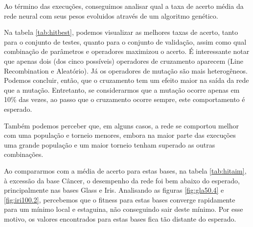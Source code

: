 \documentclass[12pt]{article}
\begin{document}
Ao término das execuções, conseguimos analisar qual a taxa de acerto média da rede neural com seus pesos evoluidos através de um algoritmo genético.

Na tabela \ref{tab:hitbest}, podemos visualizar as melhores taxas de acerto, tanto para o conjunto de testes, quanto para o conjunto de validação, assim como qual combinação de parâmetros e operadores maximizou o acerto. É interessante notar que apenas dois (dos cinco possíveis) operadores de cruzamento aparecem (Line Recombination e Aleatório). Já os operadores de mutação são mais heterogêneos. Podemos concluir, então, que o cruzamento tem um efeito maior na saída da rede que a mutação. Entretanto, se considerarmos que a mutação ocorre apenas em 10\% das vezes, ao passo que o cruzamento ocorre sempre, este comportamento é esperado.

Também podemos perceber que, em alguns casos, a rede se comportou melhor com uma população e torneio menores, embora na maior parte das execuções uma grande população e um maior torneio tenham superado as outras combinações.

Ao compararmos com a média de acerto para estas bases, na tabela \ref{tab:hitaim}, à excessão da base Câncer, o desempenho da rede foi bem abaixo do esperado, principalmente nas bases Glass e Iris. Analisando as figuras \ref{fig:gla50.4} e \ref{fig:iri100.2}, percebemos que o fitness para estas bases converge rapidamente para um mínimo local e estaguina, não conseguindo sair deste mínimo. Por esse motivo, os valores encontrados para estas bases fica tão distante do esperado.
\end{document}
